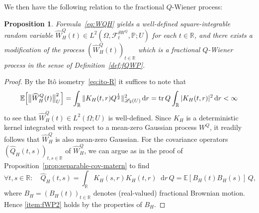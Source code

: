 \documentclass[reqno]{amsart}
\numberwithin{equation}{section}
\newcommand{\bbP}{\mathbb{P}}
\newcommand{\bbR}{\mathbb{R}}
\newcommand{\E}{\mathbb{E}}
\newcommand{\cF}{\mathcal{F}}
\newcommand{\norm}[2]{     \| #1       \|_{ #2 }}
\newcommand{\tr}{\operatorname{tr}}
\newcommand{\rd}{\mathop{}\!\mathrm{d}}
\newcommand{\LO}{\mathscr L}
\newtheorem{proposition}[lemma]{Proposition}
\theoremstyle{remark}
\theoremstyle{definition}
\begin{document}
We then have the following relation to the fractional $Q$-Wiener process:
%
\begin{proposition}\label{prop:fQWP}
	Formula~\eqref{eq:WQH} yields a well-defined square-integrable
	random variable
	$\widehat W^Q_H(t) \in L^2(\Omega, \cF_t^{\delta W^Q}, \bbP; U)$ for each $t \in \bbR$, and there exists a modification of 
	the process $(\widehat W^Q_H(t))_{t\in\bbR}$
	which is a fractional $Q$-Wiener process in the sense of Definition~\ref{def:fQWP}.
\end{proposition}
%
\begin{proof}
	By the It\^o isometry~\eqref{eq:ito-R} it suffices to note that
	\[
	\E\Bigl[\bigl\|\widehat W^Q_H(t)\bigr\|_{U}^2\Bigr] = \int_\bbR \norm{K_H(t,r)Q^\frac{1}{2}}{\LO_2(U)}^2 \rd r
	=
	\tr Q \int_\bbR |K_H(t,r)|^2 \rd r 
	< \infty
	\]
	to see that $\widehat W^Q_H(t) \in L^2(\Omega; U)$ is well-defined.
	Since $K_H$ is a deterministic kernel integrated with respect to a mean-zero Gaussian
	process $W^Q$, it readily follows that $\widehat W^Q_H$ is also mean-zero Gaussian.
	For the covariance operators $(\widehat Q_H(t,s))_{t,s\in\bbR}$ 
	of $\widehat W^Q_H$, we can argue as in the proof of Proposition~\ref{prop:separable-cov-matern} to find
	\begin{equation}
		\forall t,s \in \bbR : \quad 
		\widehat Q_H(t,s) = \int_\bbR K_H(s,r) K_H(t,r) \rd r \, Q
		=
		\E[B_H(t) B_H(s)] \, Q,
	\end{equation}
	where $B_H = (B_H(t))_{t\in\bbR}$ denotes (real-valued) fractional Brownian motion.
	Hence \ref{item:fWP2} holds by the properties of $B_H$.
	

\end{proof}
\end{document}
